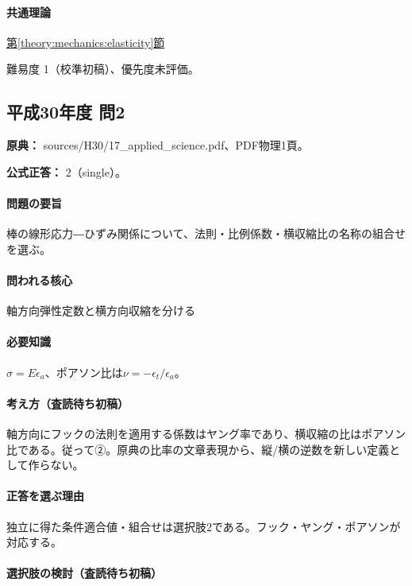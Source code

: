 \paragraph{共通理論} \hyperref[theory:mechanics:elasticity]{第\ref*{theory:mechanics:elasticity}節}

\par 難易度 1（校準初稿）、優先度未評価。

\subsection{平成30年度 問2}
\label{q:h30-reg-applied-02}

\noindent\textbf{原典：} sources/H30/17\_applied\_science.pdf、PDF物理1頁。

\textbf{公式正答：} 2（single）。

\paragraph{問題の要旨} 棒の線形応力―ひずみ関係について、法則・比例係数・横収縮比の名称の組合せを選ぶ。

\paragraph{問われる核心} 軸方向弾性定数と横方向収縮を分ける

\paragraph{必要知識} \(\sigma=E\epsilon_a\)、ポアソン比は\(\nu=-\epsilon_t/\epsilon_a\)。

\paragraph{考え方（査読待ち初稿）} 軸方向にフックの法則を適用する係数はヤング率であり、横収縮の比はポアソン比である。従って②。原典の比率の文章表現から、縦/横の逆数を新しい定義として作らない。

\paragraph{正答を選ぶ理由} 独立に得た条件適合値・組合せは選択肢2である。フック・ヤング・ポアソンが対応する。

\paragraph{選択肢の検討（査読待ち初稿）}\mbox{}\par

